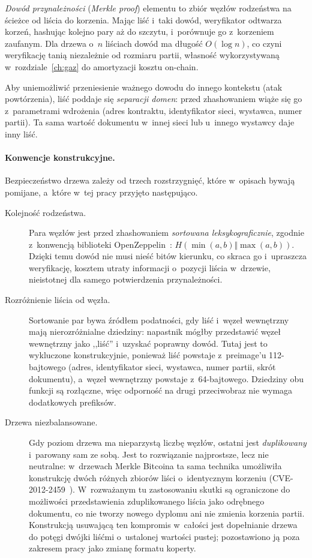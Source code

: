 \emph{Dowód przynależności} (\emph{Merkle proof}) elementu to zbiór węzłów
rodzeństwa na ścieżce od liścia do korzenia. Mając liść i~taki dowód, weryfikator
odtwarza korzeń, hashując kolejno pary aż do szczytu, i~porównuje go z~korzeniem
zaufanym. Dla drzewa o~$n$ liściach dowód ma długość $O(\log n)$, co czyni
weryfikację tanią niezależnie od rozmiaru partii, własność wykorzystywaną
w~rozdziale~\ref{ch:gaz} do amortyzacji kosztu on-chain.

Aby uniemożliwić przeniesienie ważnego dowodu do innego kontekstu (atak
powtórzenia), liść poddaje się \emph{separacji domen}: przed zhashowaniem wiąże się
go z~parametrami wdrożenia (adres kontraktu, identyfikator sieci, wystawca, numer
partii). Ta sama wartość dokumentu w~innej sieci lub u~innego wystawcy daje inny
liść.

\paragraph{Konwencje konstrukcyjne.} Bezpieczeństwo drzewa zależy od trzech
rozstrzygnięć, które w~opisach bywają pomijane, a~które w~tej pracy przyjęto
następująco.

\begin{description}
  \item[Kolejność rodzeństwa.] Para węzłów jest przed zhashowaniem
        \emph{sortowana leksykograficznie}, zgodnie z~konwencją biblioteki
        OpenZeppelin~\cite{oz-contracts}: $H(\min(a,b) \Vert \max(a,b))$.
        Dzięki temu dowód nie musi
        nieść bitów kierunku, co skraca go i~upraszcza weryfikację, kosztem
        utraty informacji o~pozycji liścia w~drzewie, nieistotnej dla samego
        potwierdzenia przynależności.
  \item[Rozróżnienie liścia od węzła.] Sortowanie par bywa źródłem podatności,
        gdy liść i~węzeł wewnętrzny mają nierozróżnialne dziedziny: napastnik
        mógłby przedstawić węzeł wewnętrzny jako ,,liść'' i~uzyskać poprawny
        dowód. Tutaj jest to wykluczone konstrukcyjnie, ponieważ liść powstaje
        z~preimage'u 112-bajtowego (adres, identyfikator sieci, wystawca, numer
        partii, skrót dokumentu), a~węzeł wewnętrzny powstaje z~64-bajtowego. Dziedziny
        obu funkcji są rozłączne, więc odporność na drugi przeciwobraz nie
        wymaga dodatkowych prefiksów.
  \item[Drzewa niezbalansowane.] Gdy poziom drzewa ma nieparzystą liczbę węzłów,
        ostatni jest \emph{duplikowany} i~parowany sam ze sobą. Jest to
        rozwiązanie najprostsze, lecz nie neutralne: w~drzewach Merkle Bitcoina
        ta sama technika umożliwiła konstrukcję dwóch różnych zbiorów liści
        o~identycznym korzeniu (CVE-2012-2459~\cite{cve2012-2459}).
        W~rozważanym tu zastosowaniu skutki są ograniczone
        do możliwości przedstawienia zduplikowanego liścia jako odrębnego
        dokumentu, co nie tworzy nowego dyplomu ani nie zmienia korzenia partii.
        Konstrukcją usuwającą ten kompromis w~całości jest dopełnianie drzewa
        do potęgi dwójki liśćmi o~ustalonej wartości pustej; pozostawiono ją poza
        zakresem pracy jako zmianę formatu koperty.
\end{description}


